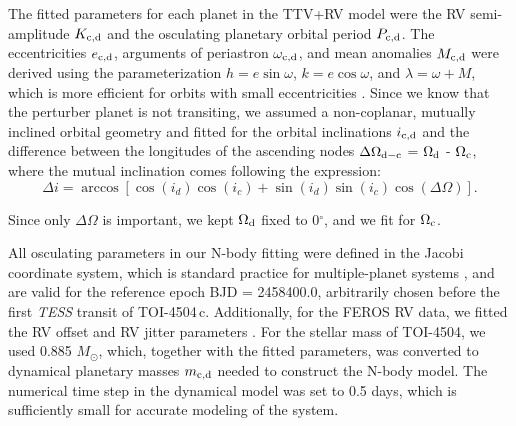 \documentclass[twocolumn,twocolappendix]{aastex631}
\begin{document}
The fitted parameters for each planet in the TTV+RV model were the RV semi-amplitude $K_{\rm c,d}$ and the osculating planetary orbital period $P_{\rm c,d}$. The eccentricities $e_{\rm c,d}$, arguments of periastron $\omega_{\rm c,d}$, and mean anomalies $M_{\rm c,d}$ were derived using the parameterization $h = e\sin\omega$, $k = e\cos\omega$, and $\lambda = \omega + M$, which is more efficient for orbits with small eccentricities \citep{Tan2013}. 
Since we know that the perturber planet is not transiting, we  assumed a non-coplanar, mutually inclined orbital geometry and fitted for the orbital inclinations $i_{\rm c,d}$ and the difference between the longitudes of the ascending nodes $\Delta\Omega_{\rm d - c}$ = $\Omega_{\rm d}$ - $\Omega_{\rm c}$, where the mutual inclination comes following the expression:
\begin{equation}
\Delta i = \arccos[\cos(i_d)\cos(i_{c})+\sin(i_d)\sin(i_{c})\cos(\Delta\Omega)] .
\label{eq:deltai}
\end{equation}

\noindent
Since only $\Delta\Omega$ is important, we kept $\Omega_{\rm d}$ fixed to 0$^{\circ}$, and we fit for $\Omega_{\rm c}$.

All osculating parameters in our N-body fitting were defined in the Jacobi coordinate system, which is standard practice for multiple-planet systems \citep[][]{Lee2003}, and are valid for the reference epoch BJD = 2458400.0, arbitrarily chosen before the first {\it TESS} transit of TOI-4504\,c.
Additionally, for the FEROS RV data, we fitted the RV offset and RV jitter parameters \citep[see,][]{Baluev2009}. For the stellar mass of TOI-4504, we used 0.885 $M_{\odot}$, which, together with the fitted parameters, was converted to dynamical planetary masses $m_{\rm c,d}$ needed to construct the N-body model. The numerical time step in the dynamical model was set to 0.5 days, which is sufficiently small for accurate modeling of the system.
\end{document}
